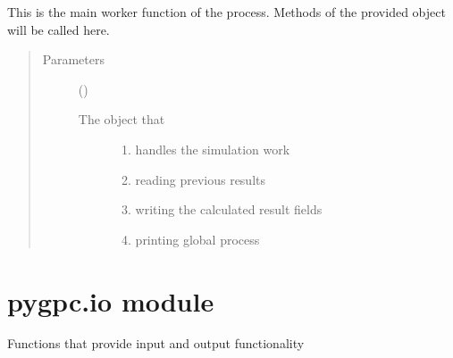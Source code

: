 \documentclass[letterpaper,10pt,english,openany,oneside]{sphinxmanual}
\begin{document}
\begin{fulllineitems}
\label{\detokenize{pygpc:pygpc.Worker.run}}
This is the main worker function of the process.
Methods of the provided object will be called here.
\begin{quote}\begin{description}
\item[{Parameters}] \leavevmode
{} () \textendash{} \begin{description}
\item[{The object that}] \leavevmode\begin{enumerate}
\def\theenumi{\alph{enumi}}
\def\labelenumi{\theenumi )}
\makeatletter\def\p@enumii{\p@enumi \theenumi )}\makeatother
\item {} 
handles the simulation work

\item {} 
reading previous results

\item {} 
writing the calculated result fields

\item {} 
printing global process

\end{enumerate}

\end{description}


\end{description}\end{quote}

\end{fulllineitems}



\section{pygpc.io module}
\label{\detokenize{pygpc:module-pygpc.io}}\label{\detokenize{pygpc:pygpc-io-module}}
Functions that provide input and output functionality
\end{document}
